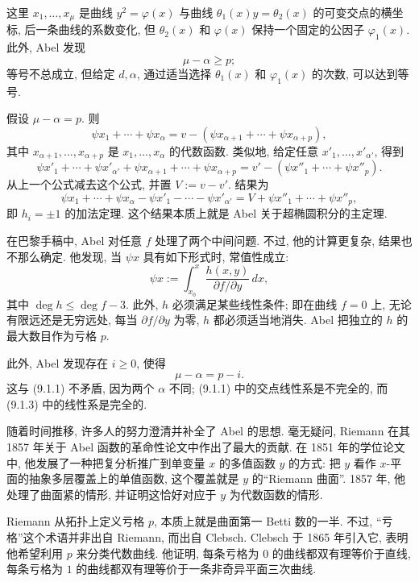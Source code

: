 这里 $x_1,\ldots,x_\mu$ 是曲线 $y^2=\varphi(x)$ 与曲线 $\theta_1(x)y=\theta_2(x)$ 的可变交点的横坐标, 后一条曲线的系数变化, 但 $\theta_2(x)$ 和 $\varphi(x)$ 保持一个固定的公因子 $\varphi_1(x)$. 此外, Abel 发现
\begin{equation}\tag{9.1.1}\label{ch09:eq911}
\mu-\alpha\geq p;
\end{equation}
等号不总成立, 但给定 $d,\alpha$, 通过适当选择 $\theta_1(x)$ 和 $\varphi_1(x)$ 的次数, 可以达到等号.

假设 $\mu-\alpha=p$. 则
\[
\psi x_1+\cdots+\psi x_\alpha=v-(\psi x_{\alpha+1}+\cdots+\psi x_{\alpha+p}),
\]
其中 $x_{\alpha+1},\ldots,x_{\alpha+p}$ 是 $x_1,\ldots,x_\alpha$ 的代数函数. 类似地, 给定任意 $x'_1,\ldots,x'_{\alpha'}$, 得到
\[
\psi x'_1+\cdots+\psi x'_{\alpha'}+\psi x_{\alpha+1}+\cdots+\psi x_{\alpha+p}
=v'-(\psi x''_1+\cdots+\psi x''_p).
\]
从上一个公式减去这个公式, 并置 $V:=v-v'$. 结果为
\[
\psi x_1+\cdots+\psi x_\alpha-\psi x'_1-\cdots-\psi x'_{\alpha'}
=V+\psi x''_1+\cdots+\psi x''_p,
\]
即 $h_i=\pm1$ 的加法定理. 这个结果本质上就是 Abel 关于超椭圆积分的主定理.

在巴黎手稿中, Abel 对任意 $f$ 处理了两个中间问题. 不过, 他的计算更复杂, 结果也不那么确定. 他发现, 当 $\psi x$ 具有如下形式时, 常值性成立:
\begin{equation}\tag{9.1.2}\label{ch09:eq912}
\psi x:=\int_{x_0}^x\frac{h(x,y)}{\partial f/\partial y}\,dx,
\end{equation}
其中 $\deg h\leq\deg f-3$. 此外, $h$ 必须满足某些线性条件; 即在曲线 $f=0$ 上, 无论有限远还是无穷远处, 每当 $\partial f/\partial y$ 为零, $h$ 都必须适当地消失. Abel 把独立的 $h$ 的最大数目作为亏格 $p$.

此外, Abel 发现存在 $i\geq0$, 使得
\begin{equation}\tag{9.1.3}\label{ch09:eq913}
\mu-\alpha=p-i.
\end{equation}
这与 (9.1.1) 不矛盾, 因为两个 $\alpha$ 不同; (9.1.1) 中的交点线性系是不完全的, 而 (9.1.3) 中的线性系是完全的.

随着时间推移, 许多人的努力澄清并补全了 Abel 的思想. 毫无疑问, Riemann 在其 1857 年关于 Abel 函数的革命性论文中作出了最大的贡献. 在 1851 年的学位论文中, 他发展了一种把复分析推广到单变量 $x$ 的多值函数 $y$ 的方式: 把 $y$ 看作 $x$-平面的抽象多层覆盖上的单值函数, 这个覆盖就是 $y$ 的“Riemann 曲面”. 1857 年, 他处理了曲面紧的情形, 并证明这恰好对应于 $y$ 为代数函数的情形.

Riemann 从拓扑上定义亏格 $p$, 本质上就是曲面第一 Betti 数的一半. 不过, “亏格”这个术语并非出自 Riemann, 而出自 Clebsch. Clebsch 于 1865 年引入它, 表明他希望利用 $p$ 来分类代数曲线. 他证明, 每条亏格为 $0$ 的曲线都双有理等价于直线, 每条亏格为 $1$ 的曲线都双有理等价于一条非奇异平面三次曲线.

